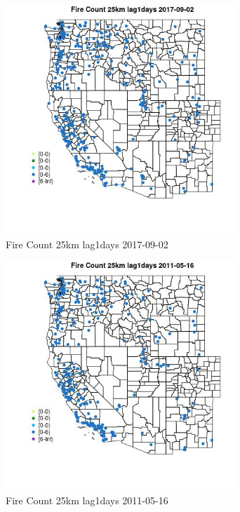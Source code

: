 \begin{figure} 
\centering  
\includegraphics[width=0.77\textwidth]{Code_Outputs/Report_ML_input_PM25_Step4_part_e_de_duplicated_aves_compiled_2019-05-20wNAs_MapObsFire_Count_25km_lag1days2017-09-02.jpg} 
\caption{\label{fig:Report_ML_input_PM25_Step4_part_e_de_duplicated_aves_compiled_2019-05-20wNAsMapObsFire_Count_25km_lag1days2017-09-02}Fire Count 25km lag1days 2017-09-02} 
\end{figure} 
 

\begin{figure} 
\centering  
\includegraphics[width=0.77\textwidth]{Code_Outputs/Report_ML_input_PM25_Step4_part_e_de_duplicated_aves_compiled_2019-05-20wNAs_MapObsFire_Count_25km_lag1days2011-05-16.jpg} 
\caption{\label{fig:Report_ML_input_PM25_Step4_part_e_de_duplicated_aves_compiled_2019-05-20wNAsMapObsFire_Count_25km_lag1days2011-05-16}Fire Count 25km lag1days 2011-05-16} 
\end{figure} 
 

